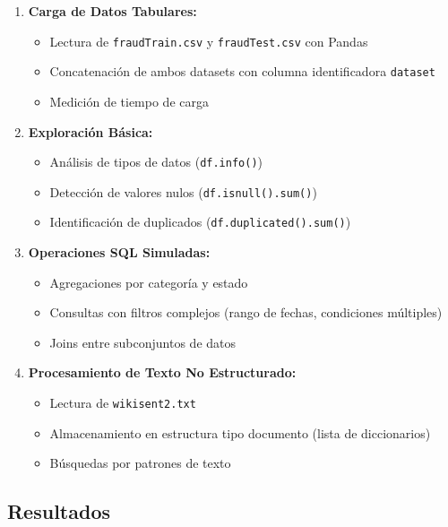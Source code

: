 \documentclass[12pt]{src/formato_utem}
\begin{document}
\begin{enumerate}
    \item \textbf{Carga de Datos Tabulares:}
    \begin{itemize}
        \item Lectura de \texttt{fraudTrain.csv} y \texttt{fraudTest.csv} con Pandas
        \item Concatenación de ambos datasets con columna identificadora \texttt{dataset}
        \item Medición de tiempo de carga
    \end{itemize}
    
    \item \textbf{Exploración Básica:}
    \begin{itemize}
        \item Análisis de tipos de datos (\texttt{df.info()})
        \item Detección de valores nulos (\texttt{df.isnull().sum()})
        \item Identificación de duplicados (\texttt{df.duplicated().sum()})
    \end{itemize}
    
    \item \textbf{Operaciones SQL Simuladas:}
    \begin{itemize}
        \item Agregaciones por categoría y estado
        \item Consultas con filtros complejos (rango de fechas, condiciones múltiples)
        \item Joins entre subconjuntos de datos
    \end{itemize}
    
    \item \textbf{Procesamiento de Texto No Estructurado:}
    \begin{itemize}
        \item Lectura de \texttt{wikisent2.txt}
        \item Almacenamiento en estructura tipo documento (lista de diccionarios)
        \item Búsquedas por patrones de texto
    \end{itemize}
\end{enumerate}

\subsection*{Resultados}
\end{document}
